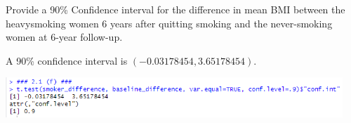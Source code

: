 Provide a 90\% Confidence interval for the difference in mean BMI between the heavysmoking women
6 years after quitting smoking and the never-smoking women at 6-year follow-up.

\soln* A 90\% confidence interval is $(-0.03178454, 3.65178454)$.

\nl \includegraphics*[width=5in]{img/2_1f_console.PNG}